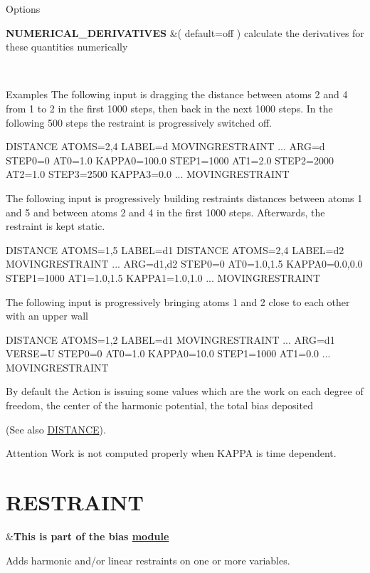 \begin{DoxyParagraph}{Options}

\end{DoxyParagraph}
\begin{TabularC}{2}
\hline
{\bfseries  N\+U\+M\+E\+R\+I\+C\+A\+L\+\_\+\+D\+E\+R\+I\+V\+A\+T\+I\+V\+E\+S } &( default=off ) calculate the derivatives for these quantities numerically  

\\
\end{TabularC}


\begin{DoxyParagraph}{Examples}
The following input is dragging the distance between atoms 2 and 4 from 1 to 2 in the first 1000 steps, then back in the next 1000 steps. In the following 500 steps the restraint is progressively switched off. \begin{DoxyVerb}DISTANCE ATOMS=2,4 LABEL=d
MOVINGRESTRAINT ...
  ARG=d
  STEP0=0    AT0=1.0 KAPPA0=100.0
  STEP1=1000 AT1=2.0
  STEP2=2000 AT2=1.0
  STEP3=2500         KAPPA3=0.0
... MOVINGRESTRAINT
\end{DoxyVerb}
 The following input is progressively building restraints distances between atoms 1 and 5 and between atoms 2 and 4 in the first 1000 steps. Afterwards, the restraint is kept static. \begin{DoxyVerb}DISTANCE ATOMS=1,5 LABEL=d1
DISTANCE ATOMS=2,4 LABEL=d2
MOVINGRESTRAINT ...
  ARG=d1,d2 
  STEP0=0    AT0=1.0,1.5 KAPPA0=0.0,0.0
  STEP1=1000 AT1=1.0,1.5 KAPPA1=1.0,1.0
... MOVINGRESTRAINT
\end{DoxyVerb}
 The following input is progressively bringing atoms 1 and 2 close to each other with an upper wall \begin{DoxyVerb}DISTANCE ATOMS=1,2 LABEL=d1
MOVINGRESTRAINT ...
  ARG=d1
  VERSE=U
  STEP0=0    AT0=1.0 KAPPA0=10.0
  STEP1=1000 AT1=0.0
... MOVINGRESTRAINT
\end{DoxyVerb}

\end{DoxyParagraph}
By default the Action is issuing some values which are the work on each degree of freedom, the center of the harmonic potential, the total bias deposited

(See also \hyperlink{DISTANCE}{D\+I\+S\+T\+A\+N\+C\+E}).

\begin{DoxyAttention}{Attention}
Work is not computed properly when K\+A\+P\+P\+A is time dependent. 
\end{DoxyAttention}
\hypertarget{RESTRAINT}{}\section{R\+E\+S\+T\+R\+A\+I\+N\+T}\label{RESTRAINT}
\begin{TabularC}{2}
\hline
&{\bfseries  This is part of the bias \hyperlink{mymodules}{module }}   \\
\end{TabularC}
Adds harmonic and/or linear restraints on one or more variables.

